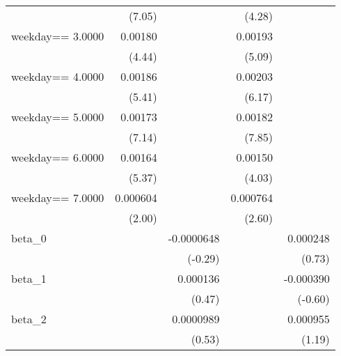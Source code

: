 \begin{table}[htbp]
\begin{tabular}{l*{4}{D{.}{.}{-1}}}
                    &      (7.05)         &                     &      (4.28)         &                     \\
\addlinespace
weekday==     3.0000&     0.00180\sym{***}&                     &     0.00193\sym{***}&                     \\
                    &      (4.44)         &                     &      (5.09)         &                     \\
\addlinespace
weekday==     4.0000&     0.00186\sym{***}&                     &     0.00203\sym{***}&                     \\
                    &      (5.41)         &                     &      (6.17)         &                     \\
\addlinespace
weekday==     5.0000&     0.00173\sym{***}&                     &     0.00182\sym{***}&                     \\
                    &      (7.14)         &                     &      (7.85)         &                     \\
\addlinespace
weekday==     6.0000&     0.00164\sym{***}&                     &     0.00150\sym{***}&                     \\
                    &      (5.37)         &                     &      (4.03)         &                     \\
\addlinespace
weekday==     7.0000&    0.000604\sym{*}  &                     &    0.000764\sym{**} &                     \\
                    &      (2.00)         &                     &      (2.60)         &                     \\
\addlinespace
beta\_0              &                     &  -0.0000648         &                     &    0.000248         \\
                    &                     &     (-0.29)         &                     &      (0.73)         \\
\addlinespace
beta\_1              &                     &    0.000136         &                     &   -0.000390         \\
                    &                     &      (0.47)         &                     &     (-0.60)         \\
\addlinespace
beta\_2              &                     &   0.0000989         &                     &    0.000955         \\
                    &                     &      (0.53)         &                     &      (1.19)         \\

\end{tabular}
\end{table}
